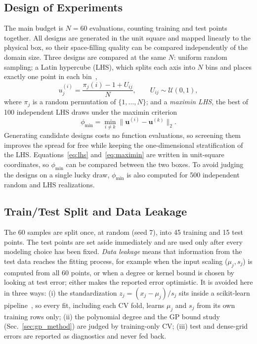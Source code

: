 \subsection{Design of Experiments}\label{sec:doe_method}

The main budget is $N=60$ evaluations, counting training and test points together. All designs are generated in the unit square and mapped linearly to the physical box, so their space-filling quality can be compared independently of the domain size. Three designs are compared at the same $N$: uniform random sampling; a Latin hypercube (LHS), which splits each axis into $N$ bins and places exactly one point in each bin~\cite{mckay1979},
\begin{equation}
  u^{(i)}_j=\frac{\pi_j(i)-1+U_{ij}}{N},\qquad U_{ij}\sim\mathcal{U}(0,1),
  \label{eq:lhs}
\end{equation}
where $\pi_j$ is a random permutation of $\{1,\dots,N\}$; and a \emph{maximin LHS}, the best of 100 independent LHS draws under the maximin criterion~\cite{johnson1990}
\begin{equation}
  \phi_{\min}=\min_{i\neq k}\big\|\mathbf{u}^{(i)}-\mathbf{u}^{(k)}\big\|_2 .
  \label{eq:maximin}
\end{equation}
Generating candidate designs costs no function evaluations, so screening them improves the spread for free while keeping the one-dimensional stratification of the LHS. Equations~\eqref{eq:lhs} and~\eqref{eq:maximin} are written in unit-square coordinates, so $\phi_{\min}$ can be compared between the two boxes. To avoid judging the designs on a single lucky draw, $\phi_{\min}$ is also computed for 500 independent random and LHS realizations.

\subsection{Train/Test Split and Data Leakage}\label{sec:split}

The 60 samples are split once, at random (seed 7), into 45 training and 15 test points. The test points are set aside immediately and are used only after every modeling choice has been fixed. \emph{Data leakage} means that information from the test data reaches the fitting process, for example when the input scaling ($\mu_j,s_j$) is computed from all 60 points, or when a degree or kernel bound is chosen by looking at test error; either makes the reported error optimistic. It is avoided here in three ways: (i) the standardization $z_j=(x_j-\mu_j)/s_j$ sits inside a scikit-learn pipeline~\cite{pedregosa2011}, so every fit, including each CV fold, learns $\mu_j$ and $s_j$ from its own training rows only; (ii) the polynomial degree and the GP bound study (Sec.~\ref{sec:gp_method}) are judged by training-only CV; (iii) test and dense-grid errors are reported as diagnostics and never fed back.

